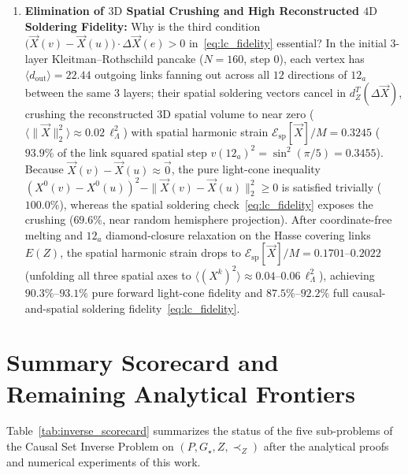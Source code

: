 \documentclass[11pt,a4paper]{article}
\theoremstyle{definition}
\theoremstyle{remark}
\newcommand{\Gstar}{G_\star}
\begin{document}
\begin{enumerate}
    \item \textbf{Elimination of $3\text{D}$ Spatial Crushing and High Reconstructed $4\text{D}$ Soldering Fidelity:} Why is the third condition $\bigl(\vec{X}(v) - \vec{X}(u)\bigr)\cdot\Delta\vec{X}(e) > 0$ in~\eqref{eq:lc_fidelity} essential? In the initial $3$-layer Kleitman--Rothschild pancake ($N = 160$, step $0$), each vertex has $\langle d_{\mathrm{out}}\rangle = 22.44$ outgoing links fanning out across all $12$ directions of $12_a$ between the same $3$ layers; their spatial soldering vectors cancel in $d_Z^T(\Delta\vec{X})$, crushing the reconstructed $3\text{D}$ spatial volume to near zero ($\langle\|\vec{X}\|_2^2\rangle \approx 0.02\,\ell_\Lambda^2$) with spatial harmonic strain $\mathcal{E}_{\mathrm{sp}}[\vec{X}]/M = 0.3245$ ($93.9\%$ of the link squared spatial step $v(12_a)^2 = \sin^2(\pi/5) = 0.3455$). Because $\vec{X}(v) - \vec{X}(u) \approx \vec{0}$, the pure light-cone inequality $(X^0(v) - X^0(u))^2 - \|\vec{X}(v) - \vec{X}(u)\|_2^2 \ge 0$ is satisfied trivially ($100.0\%$), whereas the spatial soldering check~\eqref{eq:lc_fidelity} exposes the crushing ($69.6\%$, near random hemisphere projection). After coordinate-free melting and $12_a$ diamond-closure relaxation on the Hasse covering links $E(Z)$, the spatial harmonic strain drops to $\mathcal{E}_{\mathrm{sp}}[\vec{X}]/M = 0.1701\text{--}0.2022$ (unfolding all three spatial axes to $\langle (X^k)^2\rangle \approx 0.04\text{--}0.06\,\ell_\Lambda^2$), achieving $90.3\%\text{--}93.1\%$ pure forward light-cone fidelity and $87.5\%\text{--}92.2\%$ full causal-and-spatial soldering fidelity~\eqref{eq:lc_fidelity}.
\end{enumerate}

\section{Summary Scorecard and Remaining Analytical Frontiers}
\label{sec:conclusion}

Table~\ref{tab:inverse_scorecard} summarizes the status of the five sub-problems of the Causal Set Inverse Problem on $(P, \Gstar, Z, \prec_Z)$ after the analytical proofs and numerical experiments of this work.
\end{document}
